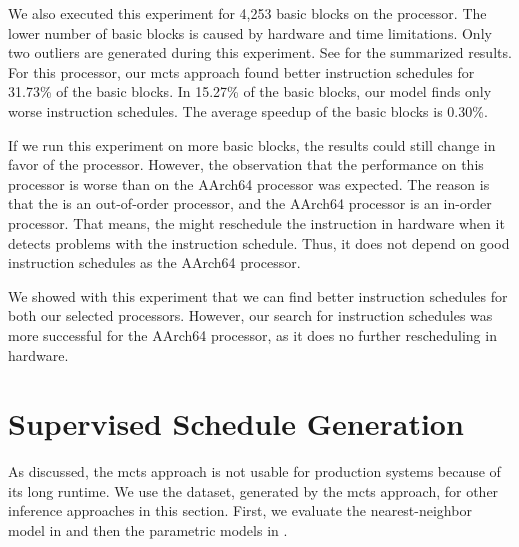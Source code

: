 We also executed this experiment for 4,253 basic blocks on the \aurora{} processor.
The lower number of basic blocks is caused by hardware and time limitations.
Only two outliers are generated during this experiment.
See  for the summarized results.
For this processor, our \ac{mcts} approach found better instruction schedules for 31.73\% of the basic blocks.
In 15.27\% of the basic blocks, our model finds only worse instruction schedules.
The average speedup of the basic blocks is 0.30\%.

If we run this experiment on more basic blocks, the results could still change in favor of the \aurora{} processor.
However, the observation that the performance on this processor is worse than on the AArch64 processor was expected.
The reason is that the \aurora{} is an out-of-order processor, and the AArch64 processor is an in-order processor.
That means, the \aurora{} might reschedule the instruction in hardware when it detects problems with the instruction schedule.
Thus, it does not depend on good instruction schedules as the AArch64 processor.

We showed with this experiment that we can find better instruction schedules for both our selected processors.
However, our search for instruction schedules was more successful for the AArch64 processor, as it does no further rescheduling in hardware.

\section{Supervised Schedule Generation}
\label{sec:eval:supervised}
As discussed, the \ac{mcts} approach is not usable for production systems because of its long runtime.
We use the dataset, generated by the \ac{mcts} approach, for other inference approaches in this section.
First, we evaluate the nearest-neighbor model in  and then the parametric models in .


